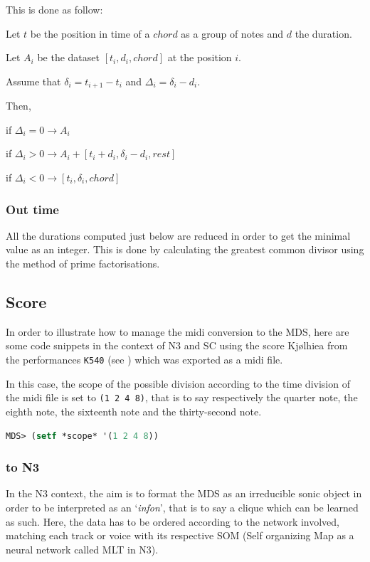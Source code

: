 This is done as follow:

\noindent Let $t$ be the position in time of a $chord$ as a group of notes and $d$ the duration.

\noindent Let $A_i$ be the dataset $[ t_i, d_i, chord ]$ at the position $i$.

\noindent Assume that $\delta_i = t_{i+1} - t_i$ and $\Delta_i = \delta_i - d_i$.

\noindent Then,

if $\Delta_i = 0 \rightarrow A_i$

if $\Delta_i > 0 \rightarrow A_i + [ t_i + d_i, \delta_i - d_i, rest ]$

if $\Delta_i < 0 \rightarrow [ t_i, \delta_i, chord ]$

\subsubsection{Out time}

All the durations computed just below are reduced in order to get the minimal value as an integer. This is done by calculating the greatest common divisor using the method of prime factorisations.

\subsection{Score}
\label{score}

In order to illustrate how to manage the midi conversion to the MDS, here are some code snippets in the context of N3 and SC using the score Kj{\o}lhiea from the performances \texttt{K540} (see ) which was exported as a midi file.

\smallskip

In this case, the scope of the possible division according to the time division of the midi file is set to \texttt{(1 2 4 8)}, that is to say respectively the quarter note, the eighth note, the sixteenth note and the thirty-second note.

\begin{lstlisting}[language=Lisp]
MDS> (setf *scope* '(1 2 4 8))
\end{lstlisting}

\subsubsection{to N3}

In the N3 context, the aim is to format the MDS as an irreducible sonic object in order to be interpreted as an `\textit{infon}', that is to say a clique which can be learned as such. Here, the data has to be ordered according to the network involved, matching each track or voice with its respective SOM (Self organizing Map as a neural network called MLT in N3). 

